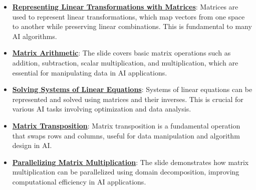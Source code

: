 \documentclass{article}%
\begin{document}
\begin{itemize}[leftmargin=*]%
\item \href{https://purdue.brightspace.com/d2l/common/assets/pdfjs-d2l-dist/1.0.14-legacy/web/viewer.html?file=%2Fcontent%2Fenforced%2F1095467-wl.202510.CS.24300.001%2F04L1-Linear Algebra Primer.pdf%3Fou%3D1095467&lang=en-us&container=d2l-fileviewer-rendered-pdf&fullscreen=d2l-fileviewer-rendered-pdf-dialog&height=667#page=5}{\textbf{Representing Linear Transformations with Matrices}}: Matrices are used to represent linear transformations, which map vectors from one space to another while preserving linear combinations. This is fundamental to many AI algorithms.%
\item \href{https://purdue.brightspace.com/d2l/common/assets/pdfjs-d2l-dist/1.0.14-legacy/web/viewer.html?file=%2Fcontent%2Fenforced%2F1095467-wl.202510.CS.24300.001%2F04L1-Linear Algebra Primer.pdf%3Fou%3D1095467&lang=en-us&container=d2l-fileviewer-rendered-pdf&fullscreen=d2l-fileviewer-rendered-pdf-dialog&height=667#page=9}{\textbf{Matrix Arithmetic}}: The slide covers basic matrix operations such as addition, subtraction, scalar multiplication, and multiplication, which are essential for manipulating data in AI applications.%
\item \href{https://purdue.brightspace.com/d2l/common/assets/pdfjs-d2l-dist/1.0.14-legacy/web/viewer.html?file=%2Fcontent%2Fenforced%2F1095467-wl.202510.CS.24300.001%2F04L1-Linear Algebra Primer.pdf%3Fou%3D1095467&lang=en-us&container=d2l-fileviewer-rendered-pdf&fullscreen=d2l-fileviewer-rendered-pdf-dialog&height=667#page=11}{\textbf{Solving Systems of Linear Equations}}: Systems of linear equations can be represented and solved using matrices and their inverses. This is crucial for various AI tasks involving optimization and data analysis.%
\item \href{https://purdue.brightspace.com/d2l/common/assets/pdfjs-d2l-dist/1.0.14-legacy/web/viewer.html?file=%2Fcontent%2Fenforced%2F1095467-wl.202510.CS.24300.001%2F04L1-Linear Algebra Primer.pdf%3Fou%3D1095467&lang=en-us&container=d2l-fileviewer-rendered-pdf&fullscreen=d2l-fileviewer-rendered-pdf-dialog&height=667#page=16}{\textbf{Matrix Transposition}}: Matrix transposition is a fundamental operation that swaps rows and columns, useful for data manipulation and algorithm design in AI.%
\item \href{https://purdue.brightspace.com/d2l/common/assets/pdfjs-d2l-dist/1.0.14-legacy/web/viewer.html?file=%2Fcontent%2Fenforced%2F1095467-wl.202510.CS.24300.001%2F04L1-Linear Algebra Primer.pdf%3Fou%3D1095467&lang=en-us&container=d2l-fileviewer-rendered-pdf&fullscreen=d2l-fileviewer-rendered-pdf-dialog&height=667#page=18}{\textbf{Parallelizing Matrix Multiplication}}: The slide demonstrates how matrix multiplication can be parallelized using domain decomposition, improving computational efficiency in AI applications.%

\end{itemize}
\end{document}

